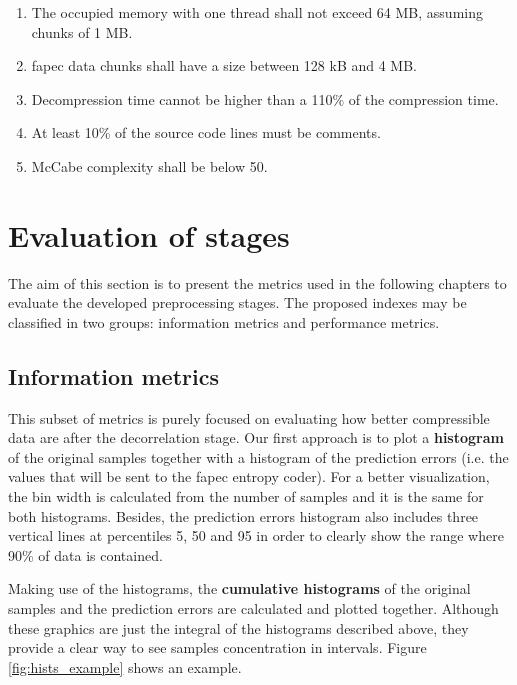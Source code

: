 \begin{enumerate}
	\item The occupied memory with one thread shall not exceed 64 MB, assuming chunks of 1 MB.
	\item \acrshort{fapec} data chunks shall have a size between 128 kB and 4 MB. \label{spec:chunk_size}
	\item Decompression time cannot be higher than a 110\% of the compression time.
	\item At least 10\% of the source code lines must be comments.
	\item McCabe complexity \parencite{mccabe} shall be below 50.
\end{enumerate}

\section{Evaluation of stages} \label{sec:metrics}
The aim of this section is to present the metrics used in the following chapters to evaluate the developed preprocessing stages. The proposed indexes may be classified in two groups: information metrics and performance metrics.

\subsection{Information metrics}
This subset of metrics is purely focused on evaluating how better compressible data are after the decorrelation stage. Our first approach is to plot a \textbf{histogram} of the original samples together with a histogram of the prediction errors (i.e. the values that will be sent to the \acrshort{fapec} entropy coder). For a better visualization, the bin width is calculated from the number of samples and it is the same for both histograms. Besides, the prediction errors histogram also includes three vertical lines at percentiles 5, 50 and 95 in order to clearly show the range where 90\% of data is contained.

Making use of the histograms, the \textbf{cumulative histograms} of the original samples and the prediction errors are calculated and plotted together. Although these graphics are just the integral of the histograms described above, they provide a clear way to see samples concentration in intervals. Figure \ref{fig:hists_example} shows an example.

